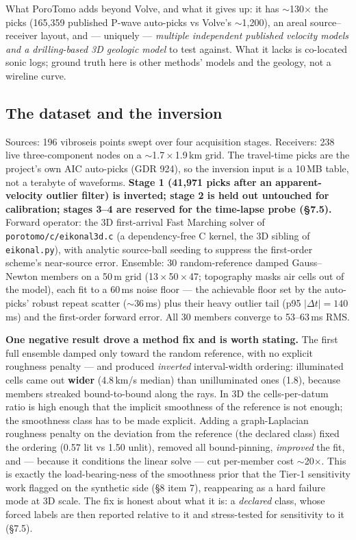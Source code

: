 \documentclass[11pt]{article}
\newcommand{\file}[1]{\texttt{#1}}
\begin{document}
What PoroTomo adds beyond Volve, and what it gives up: it has
$\sim$130$\times$ the picks (165{,}359 published P-wave auto-picks vs
Volve's $\sim$1{,}200), an areal source--receiver layout, and --- uniquely
--- \emph{multiple independent published velocity models and a
drilling-based 3D geologic model} to test against. What it lacks is
co-located sonic logs; ground truth here is other methods' models and the
geology, not a wireline curve.

\subsection{The dataset and the inversion}

Sources: 196 vibroseis points swept over four acquisition stages.
Receivers: 238 live three-component nodes on a $\sim$1.7\,$\times$\,1.9\,km
grid. The travel-time picks are the project's own AIC auto-picks (GDR 924),
so the inversion input is a 10\,MB table, not a terabyte of waveforms.
\textbf{Stage 1 (41{,}971 picks after an apparent-velocity outlier filter)
is inverted; stage 2 is held out untouched for calibration; stages 3--4
are reserved for the time-lapse probe (\S7.5).} Forward operator: the 3D
first-arrival Fast Marching solver of \file{porotomo/c/eikonal3d.c} (a
dependency-free C kernel, the 3D sibling of \file{eikonal.py}), with
analytic source-ball seeding to suppress the first-order scheme's
near-source error. Ensemble: 30 random-reference damped Gauss--Newton
members on a 50\,m grid (13\,$\times$\,50\,$\times$\,47; topography masks
air cells out of the model), each fit to a 60\,ms noise floor --- the
achievable floor set by the auto-picks' robust repeat scatter
($\sim$36\,ms) plus their heavy outlier tail (p95 $|\Delta t| = 140$\,ms)
and the first-order forward error. All 30 members converge to 53--63\,ms
RMS.

\textbf{One negative result drove a method fix and is worth stating.} The
first full ensemble damped only toward the random reference, with no
explicit roughness penalty --- and produced \emph{inverted} interval-width
ordering: illuminated cells came out \textbf{wider} (4.8\,km/s median)
than unilluminated ones (1.8), because members streaked bound-to-bound
along the rays. In 3D the cells-per-datum ratio is high enough that the
implicit smoothness of the reference is not enough; the smoothness class
has to be made explicit. Adding a graph-Laplacian roughness penalty on the
deviation from the reference (the declared class) fixed the ordering
(0.57 lit vs 1.50 unlit), removed all bound-pinning, \emph{improved} the
fit, and --- because it conditions the linear solve --- cut per-member
cost $\sim$20$\times$. This is exactly the load-bearing-ness of the
smoothness prior that the Tier-1 sensitivity work flagged on the synthetic
side (\S8 item 7), reappearing as a hard failure mode at 3D scale. The fix
is honest about what it is: a \emph{declared} class, whose forced labels
are then reported relative to it and stress-tested for sensitivity to it
(\S7.5).
\end{document}
